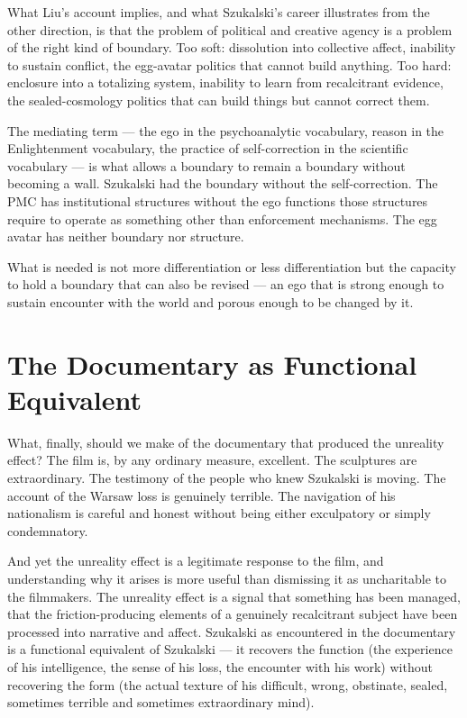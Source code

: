 \documentclass[11pt, a4paper]{article}
\theoremstyle{named}
\begin{document}
What Liu's account implies, and what Szukalski's career illustrates
from the other direction, is that the problem of political and
creative agency is a problem of the right kind of boundary. Too soft:
dissolution into collective affect, inability to sustain conflict,
the egg-avatar politics that cannot build anything. Too hard:
enclosure into a totalizing system, inability to learn from
recalcitrant evidence, the sealed-cosmology politics that can build
things but cannot correct them.

The mediating term — the ego in the psychoanalytic vocabulary, reason
in the Enlightenment vocabulary, the practice of self-correction in
the scientific vocabulary — is what allows a boundary to remain a
boundary without becoming a wall. Szukalski had the boundary without
the self-correction. The PMC has institutional structures without the
ego functions those structures require to operate as something other
than enforcement mechanisms. The egg avatar has neither boundary nor
structure.

\begin{keybox}
What is needed is not more differentiation or less differentiation
but the capacity to hold a boundary that can also be revised — an
ego that is strong enough to sustain encounter with the world and
porous enough to be changed by it.
\end{keybox}

\section{The Documentary as Functional Equivalent}

What, finally, should we make of the documentary that produced the
unreality effect? The film is, by any ordinary measure, excellent.
The sculptures are extraordinary. The testimony of the people who
knew Szukalski is moving. The account of the Warsaw loss is genuinely
terrible. The navigation of his nationalism is careful and honest
without being either exculpatory or simply condemnatory.

And yet the unreality effect is a legitimate response to the film,
and understanding why it arises is more useful than dismissing it
as uncharitable to the filmmakers. The unreality effect is a signal
that something has been managed, that the friction-producing elements
of a genuinely recalcitrant subject have been processed into
narrative and affect. Szukalski as encountered in the documentary is
a functional equivalent of Szukalski — it recovers the function (the
experience of his intelligence, the sense of his loss, the encounter
with his work) without recovering the form (the actual texture of
his difficult, wrong, obstinate, sealed, sometimes terrible and
sometimes extraordinary mind).
\end{document}

